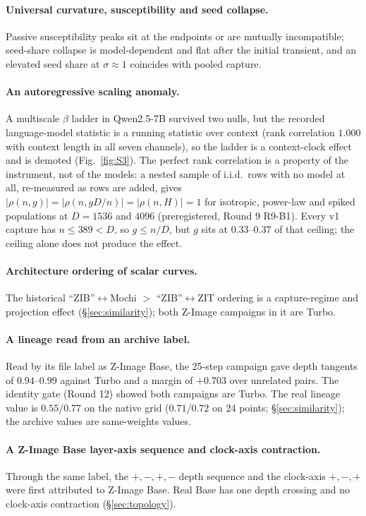 \paragraph{Universal curvature, susceptibility and seed collapse.} Passive susceptibility peaks sit at the endpoints or are mutually incompatible; seed-share collapse is model-dependent and flat after the initial transient, and an elevated seed share at $\sigma\approx1$ coincides with pooled capture.

\paragraph{An autoregressive scaling anomaly.} A multiscale $\beta$ ladder in Qwen2.5-7B survived two nulls, but the recorded language-model statistic is a running statistic over context (rank correlation $1.000$ with context length in all seven channels), so the ladder is a context-clock effect and is demoted (Fig.~\ref{fig:S3}). The perfect rank correlation is a property of the instrument, not of the models: a nested sample of i.i.d.\ rows with no model at all, re-measured as rows are added, gives $|\rho(n,g)|=|\rho(n,gD/n)|=|\rho(n,H)|=1$ for isotropic, power-law and spiked populations at $D=1536$ and $4096$ (preregistered, Round 9 R9-B1). Every v1 capture has $n\le389<D$, so $g\le n/D$, but $g$ sits at $0.33$--$0.37$ of that ceiling; the ceiling alone does not produce the effect.

\paragraph{Architecture ordering of scalar curves.} The historical ``ZIB''$\leftrightarrow$Mochi $>$ ``ZIB''$\leftrightarrow$ZIT ordering is a capture-regime and projection effect (\S\ref{sec:similarity}); both Z-Image campaigns in it are Turbo.

\paragraph{A lineage read from an archive label.} Read by its file label as Z-Image Base, the 25-step campaign gave depth tangents of $0.94$--$0.99$ against Turbo and a margin of $+0.703$ over unrelated pairs. The identity gate (Round 12) showed both campaigns are Turbo. The real lineage value is $0.55$/$0.77$ on the native grid ($0.71$/$0.72$ on 24 points; \S\ref{sec:similarity}); the archive values are same-weights values.

\paragraph{A Z-Image Base layer-axis sequence and clock-axis contraction.} Through the same label, the $+,-,+,-$ depth sequence and the clock-axis $+,-,+$ were first attributed to Z-Image Base. Real Base has one depth crossing and no clock-axis contraction (\S\ref{sec:topology}).

